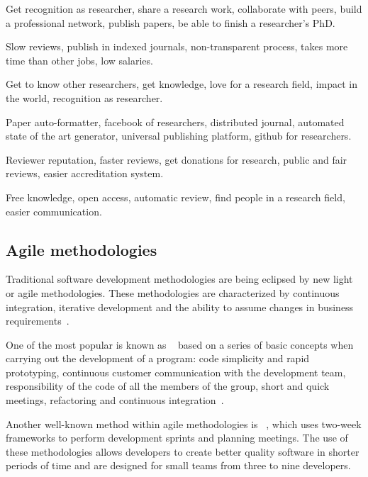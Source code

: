 \begin{itemize}
   Get recognition as researcher, share a research work,
  collaborate with peers, build a professional network, publish papers, be able
  to finish a researcher's PhD.

   Slow reviews, publish in indexed journals,
  non-transparent process, takes more time than other jobs, low salaries.

   Get to know other researchers, get knowledge, love for
  a research field, impact in the world, recognition as researcher.

   Paper auto-formatter, facebook of researchers,
  distributed journal, automated state of the art generator, universal
  publishing platform, github for researchers.

   Reviewer reputation, faster reviews, get donations for
  research, public and fair reviews, easier accreditation system.

   Free knowledge, open access, automatic review, find
  people in a research field, easier communication.
\end{itemize}

\subsection{Agile methodologies}
Traditional software development methodologies are being eclipsed by new light
or agile methodologies. These methodologies are characterized by continuous
integration, iterative development and the ability to assume changes in business
requirements~\cite{boehm2005management,livermore2008factors}.

One of the most popular is known as ~\cite{lindstrom2004extreme} based on a series of basic concepts
when carrying out the development of a program: code simplicity and rapid
prototyping, continuous customer communication with the development team,
responsibility of the code of all the members of the group, short and quick
meetings, refactoring and continuous integration~\cite{theunissen2005search}.

Another well-known method within agile methodologies is
~\cite{rising2000scrum}, which uses two-week frameworks to perform
development sprints and planning meetings. The use of these methodologies allows
developers to create better quality software in shorter periods of time and are
designed for small teams from three to nine developers.

